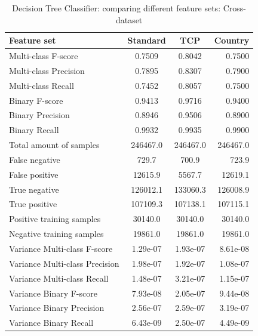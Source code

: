 \begin{table}[H]
\caption{Decision Tree Classifier: comparing different feature sets: Cross-dataset}
\label{tab:tree:cross}
\centering
\begin{tabular}{l c c r}
\toprule
Feature set & Standard & TCP & Country \\
\midrule
Multi-class F-score & 0.7509 & 0.8042 & 0.7500 \\
Multi-class Precision & 0.7895 & 0.8307 & 0.7900 \\
Multi-class Recall & 0.7452 & 0.8057 & 0.7500 \\
\midrule
Binary F-score & 0.9413 & 0.9716 & 0.9400 \\
Binary Precision & 0.8946 & 0.9506 & 0.8900 \\
Binary Recall & 0.9932 & 0.9935 & 0.9900 \\
\midrule
Total amount of samples & 246467.0 & 246467.0 & 246467.0 \\
False negative & 729.7  &  700.9 & 723.9 \\
False positive & 12615.9 & 5567.7 & 12619.1 \\
True negative & 126012.1 &  133060.3 & 126008.9  \\
True positive & 107109.3 & 107138.1 & 107115.1 \\
\midrule
Positive training samples & 30140.0 & 30140.0 & 30140.0\\
Negative training samples & 19861.0 & 19861.0 & 19861.0\\
\midrule
Variance Multi-class F-score & 1.29e-07 & 1.93e-07 & 8.61e-08 \\
Variance Multi-class Precision & 1.98e-07  &  1.92e-07  &  1.08e-07 \\
Variance Multi-class Recall &  1.48e-07 &  3.21e-07 &  1.15e-07  \\
\midrule
Variance Binary F-score & 7.93e-08  & 2.05e-07 & 9.44e-08   \\
Variance Binary Precision & 2.56e-07  &  2.59e-07  & 3.19e-07    \\
Variance Binary Recall & 6.43e-09 &  2.50e-07  & 4.49e-09 \\
\bottomrule
\end{tabular}
\end{table}

